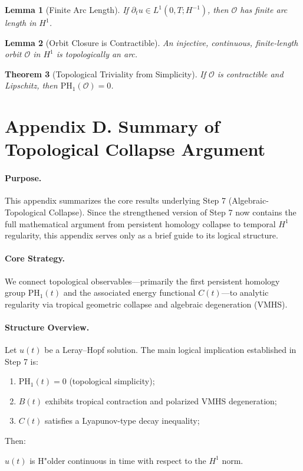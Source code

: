 \documentclass[11pt]{article}
\newtheorem{theorem}{Theorem}[section]
\newtheorem{lemma}[theorem]{Lemma}
\theoremstyle{definition}
\begin{document}
\begin{lemma}[Finite Arc Length]
If $\partial_t u \in L^1(0, T; H^{-1})$, then $\mathcal{O}$ has finite arc length in $H^1$.
\end{lemma}

\begin{lemma}[Orbit Closure is Contractible]
An injective, continuous, finite-length orbit $\mathcal{O}$ in $H^1$ is topologically an arc.
\end{lemma}

\begin{theorem}[Topological Triviality from Simplicity]
If $\mathcal{O}$ is contractible and Lipschitz, then $\mathrm{PH}_1(\mathcal{O}) = 0$.
\end{theorem}


\section*{Appendix D. Summary of Topological Collapse Argument}

\paragraph{Purpose.}
This appendix summarizes the core results underlying Step 7 (Algebraic-Topological Collapse). Since the strengthened version of Step 7 now contains the full mathematical argument from persistent homology collapse to temporal $H^1$ regularity, this appendix serves only as a brief guide to its logical structure.

\paragraph{Core Strategy.}
We connect topological observables—primarily the first persistent homology group $\mathrm{PH}_1(t)$ and the associated energy functional $C(t)$—to analytic regularity via tropical geometric collapse and algebraic degeneration (VMHS).

\paragraph{Structure Overview.}
Let $u(t)$ be a Leray--Hopf solution. The main logical implication established in Step 7 is:
\begin{enumerate}
  \item $\mathrm{PH}_1(t) = 0$ (topological simplicity);
  \item $B(t)$ exhibits tropical contraction and polarized VMHS degeneration;
  \item $C(t)$ satisfies a Lyapunov-type decay inequality;
\end{enumerate}
Then:
\begin{center}
$u(t)$ is H"older continuous in time with respect to the $H^1$ norm.
\end{center}
\end{document}
